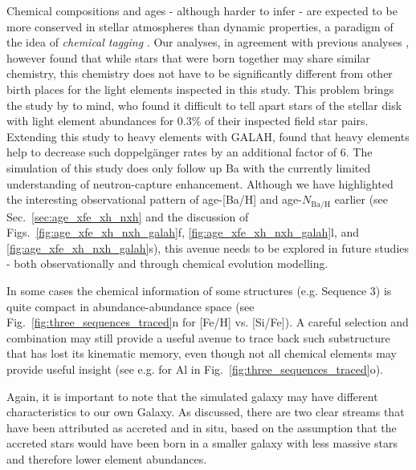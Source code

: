 \documentclass[fleqn,usenatbib]{mnras}
\begin{document}
Chemical compositions and ages - although harder to infer - are expected to be more conserved in stellar atmospheres than dynamic properties, a paradigm of the idea of \textit{chemical tagging} \citep{FreemanBlandHawthorn2002}. Our analyses, in agreement with previous analyses \citep[e.g.][]{Khoperskov2023c, Rey2023}, however found that while stars that were born together may share similar chemistry, this chemistry does not have to be significantly different from other birth places for the light elements inspected in this study. This problem brings the study by \citet{Ness2018} to mind, who found it difficult to tell apart stars of the stellar disk with light element abundances for $0.3\%$ of their inspected field star pairs. Extending this study to heavy elements with GALAH, \citep{Manea2023} found that heavy elements help to decrease such doppelgänger rates by an additional factor of 6. The simulation of this study does only follow up Ba with the currently limited understanding of neutron-capture enhancement. Although we have highlighted the interesting observational pattern of age-[Ba/H] and age-$N_\mathrm{Ba/H}$ earlier (see Sec.~\ref{sec:age_xfe_xh_nxh} and the discussion of Figs.~\ref{fig:age_xfe_xh_nxh_galah}f, \ref{fig:age_xfe_xh_nxh_galah}l, and \ref{fig:age_xfe_xh_nxh_galah}s), this avenue needs to be explored in future studies - both observationally and through chemical evolution modelling.

In some cases the chemical information of some structures (e.g. Sequence 3) is quite compact in abundance-abundance space (see Fig.~\ref{fig:three_sequences_traced}n for [Fe/H] vs. [Si/Fe]). A careful selection and combination may still provide a useful avenue to trace back such substructure that has lost its kinematic memory, even though not all chemical elements may provide useful insight (see e.g. for Al in Fig.~\ref{fig:three_sequences_traced}o).

Again, it is important to note that the simulated galaxy may have different characteristics to our own Galaxy. As discussed, there are two clear streams that have been attributed as accreted and in situ, based on the assumption that the accreted stars would have been born in a smaller galaxy with less massive stars and therefore lower element abundances.
\end{document}
